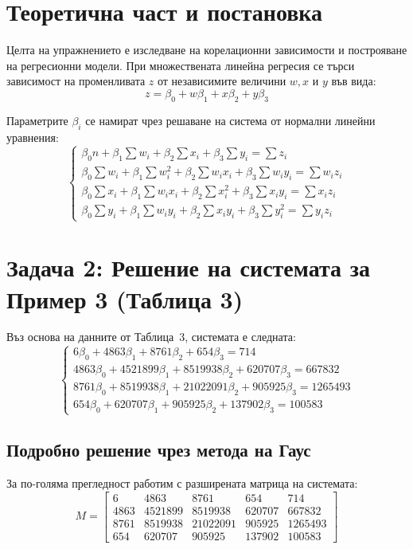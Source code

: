 \section{Теоретична част и постановка}
\label{sec:theory}
Целта на упражнението е изследване на корелационни зависимости и построяване на регресионни модели. При множествената линейна регресия се търси зависимост на променливата $z$ от независимите величини $w, x$ и $y$ във вида:
\begin{equation}
\label{eq:regression}
z = \beta_0 + w\beta_1 + x\beta_2 + y\beta_3
\end{equation}

Параметрите $\beta_i$ се намират чрез решаване на система от нормални линейни уравнения:
\begin{equation}
\label{eq:normal-system}
\begin{cases}
\beta_0 n + \beta_1 \sum w_i + \beta_2 \sum x_i + \beta_3 \sum y_i = \sum z_i \\
\beta_0 \sum w_i + \beta_1 \sum w_i^2 + \beta_2 \sum w_i x_i + \beta_3 \sum w_i y_i = \sum w_i z_i \\
\beta_0 \sum x_i + \beta_1 \sum w_i x_i + \beta_2 \sum x_i^2 + \beta_3 \sum x_i y_i = \sum x_i z_i \\
\beta_0 \sum y_i + \beta_1 \sum w_i y_i + \beta_2 \sum x_i y_i + \beta_3 \sum y_i^2 = \sum y_i z_i
\end{cases}
\end{equation}

\section{Задача 2: Решение на системата за Пример 3 (Таблица 3)}
\label{sec:table3}
Въз основа на данните от Таблица~3, системата е следната:
\begin{equation}
\label{eq:system3}
\begin{cases}
6\beta_0 + 4863\beta_1 + 8761\beta_2 + 654\beta_3 = 714 \\
4863\beta_0 + 4521899\beta_1 + 8519938\beta_2 + 620707\beta_3 = 667832 \\
8761\beta_0 + 8519938\beta_1 + 21022091\beta_2 + 905925\beta_3 = 1265493 \\
654\beta_0 + 620707\beta_1 + 905925\beta_2 + 137902\beta_3 = 100583
\end{cases}
\end{equation}

\subsection{Подробно решение чрез метода на Гаус}
За по-голяма прегледност работим с разширената матрица на системата:
\[
M = \left[ \begin{array}{cccc|c}
6 & 4863 & 8761 & 654 & 714 \\
4863 & 4521899 & 8519938 & 620707 & 667832 \\
8761 & 8519938 & 21022091 & 905925 & 1265493 \\
654 & 620707 & 905925 & 137902 & 100583
\end{array} \right]
\]

